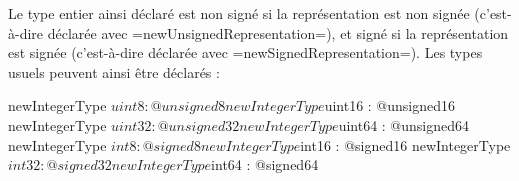 Le type entier ainsi déclaré est non signé si la représentation est non signée (c'est-à-dire déclarée avec \plm=newUnsignedRepresentation=), et signé si la représentation est signée (c'est-à-dire déclarée avec \plm=newSignedRepresentation=). Les types usuels peuvent ainsi être déclarés :
\begin{PLM}
newIntegerType $uint8  : @unsigned8
newIntegerType $uint16 : @unsigned16
newIntegerType $uint32 : @unsigned32
newIntegerType $uint64 : @unsigned64
newIntegerType $int8  : @signed8
newIntegerType $int16 : @signed16
newIntegerType $int32 : @signed32
newIntegerType $int64 : @signed64
\end{PLM}


